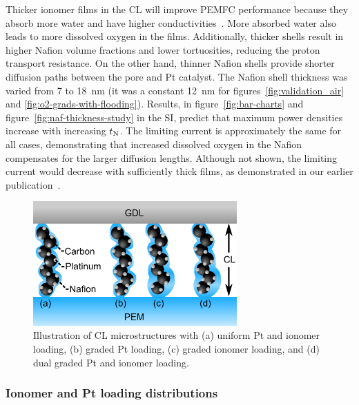\documentclass[final,3p,times,twocolumn]{elsarticle}    %
\begin{document}
Thicker ionomer films in the CL will improve PEMFC performance because they absorb more water and have higher conductivities~\cite{bib:decaluwe_2018, bib:kusoglu_2017, bib:eastman_2013}. More absorbed water also leads to more dissolved oxygen in the films. Additionally, thicker shells result in higher Nafion volume fractions and lower tortuosities, reducing the proton transport resistance. On the other hand, thinner Nafion shells provide shorter diffusion paths between the pore and Pt catalyst. The Nafion shell thickness was varied from 7 to 18~nm (it was a constant 12~nm for figures~\ref{fig:validation_air} and \ref{fig:o2-grads-with-flooding}). Results, in figure~\ref{fig:bar-charts} and figure~\ref{fig:naf-thickness-study} in the SI, predict that maximum power densities increase with increasing $t_{\rm N}$. The limiting current is approximately the same for all cases, demonstrating that increased dissolved oxygen in the Nafion compensates for the larger diffusion lengths. Although not shown, the limiting current would decrease with sufficiently thick films, as demonstrated in our earlier publication~\cite{bib:randall_2020}. %

\begin{figure}[!tb]
    \centering
    \includegraphics[width=3.07in]{figures/design-study-3_07in.png}
    \caption{Illustration of CL microstructures with (a) uniform Pt and ionomer loading, (b) graded Pt loading, (c) graded ionomer loading, and (d) dual graded Pt and ionomer loading.}
    \label{fig:design-study}
\end{figure}

\subsubsection{Ionomer and Pt loading distributions}
\end{document}
